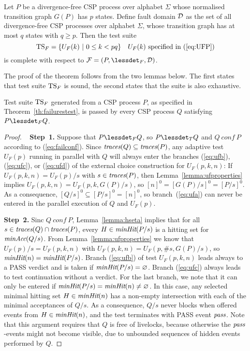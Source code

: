  
\begin{theorem}\label{th:failurestest}
Let $P$ be a divergence-free CSP process over alphabet $\Sigma$ whose
normalised transition graph $G(P)$ has $p$ states. Define fault domain ${\cal
D}$ as the set of all divergence-free CSP processes over alphabet $\Sigma$,
whose transition graph has at most $q$ states with $q \ge p$. Then the test
suite
\[
{\text{TS}}_F = \{ U_F(k)~|~0 \le k < pq  \}\quad\text{$U_F(k)$ specified in (\ref{eq:UFP})}
\]
is complete with respect to ${\cal F} = (P,\lessdet_F,{\cal D})$.
\end{theorem}
%
The proof of the theorem follows from the two lemmas below. The first states
that test suite ${\text{TS}}_F$ is sound, the second states that the suite is also
exhaustive.
%
\begin{lemma}\label{lemma:mainfsound}
Test suite ${\text{TS}}_F$ generated from a CSP process $P$, as specified in
Theorem~\ref{th:failurestest}, is passed by every CSP process $Q$ satisfying
$P\lessdet_F Q$.
\end{lemma}
\begin{proof}{~}\newline
{\bf Step~1.} Suppose that $P\lessdet_F Q$, so $P\lessdet_T Q$ and  $Q\ conf\
P$ according to (\ref{eq:failconf}). Since   $\text{\it traces}(Q)\subseteq \text{\it traces}(P)$,
any adaptive test $U_F(p)$ running in parallel with $Q$ will always enter the
branches (\ref{eq:ufb}), (\ref{eq:ufc}), or (\ref{eq:ufd}) of the external
choice construction for $U_F(p,k,n)$:  
If $U_F(p,k,n) = U_F(p)/s$ with $s\in\text{\it traces}(P)$, then Lemma~\ref{lemma:ufproperties}
implies $U_F(p,k,n) = U_F(p,k,G(P)/s)$, so $[n]^0 = [G(P)/s]^0 = [P/s]^0$. As
a consequence, $[Q/s]^0\subseteq [P/s]^0 = [n]^0$, so branch~(\ref{eq:ufa}) can never be
entered in the parallel execution of $Q$ and $U_F(p)$.

\medskip
\noindent
{\bf Step~2.} Sinc $Q\ conf\ P$, Lemma~\ref{lemma:hseta} implies that for all  
$s\in\text{\it traces}(Q)\cap\text{\it traces}(P)$, every $H \in \text{\it minHit}(P/s)$ is a hitting set for
$\text{\it minAcc}(Q/s)$. 
From Lemma~\ref{lemma:ufproperties} we know that
$U_F(p)/s = U_F(p,k,n)$ with $U_F(p,k,n) = U_F(p,\#s,G(P)/s)$, 
so $\text{\it minHit}(n) = \text{\it minHit}(P/s)$. 
Branch (\ref{eq:ufb}) of test $U_F(p,k,n)$ leads always to a
PASS verdict and is taken if $\text{\it minHit}(P/s) = \varnothing$. Branch (\ref{eq:ufc}) 
always leads to test continuation without a
verdict. For the last branch, we note that it can only be entered if $\text{\it minHit}(P/s)
= \text{\it minHit}(n) \neq\varnothing$. In this case,
any selected minimal hitting set
$H\in\text{\it minHit}(n)$ has a non-empty intersection with each of the minimal
acceptances of $Q/s$. 
As a consequence, $Q/s$ never blocks when offered
events from $H\in\text{\it minHit}(n)$, 
and the test terminates with PASS event ${\text{\it pass}}$. Note that
this argument requires that $Q$ is free of livelocks, because otherwise the
${\text{\it pass}}$-events might not become visible, due to unbounded sequences of
hidden events performed by $Q$. 
\xbox
\end{proof}
